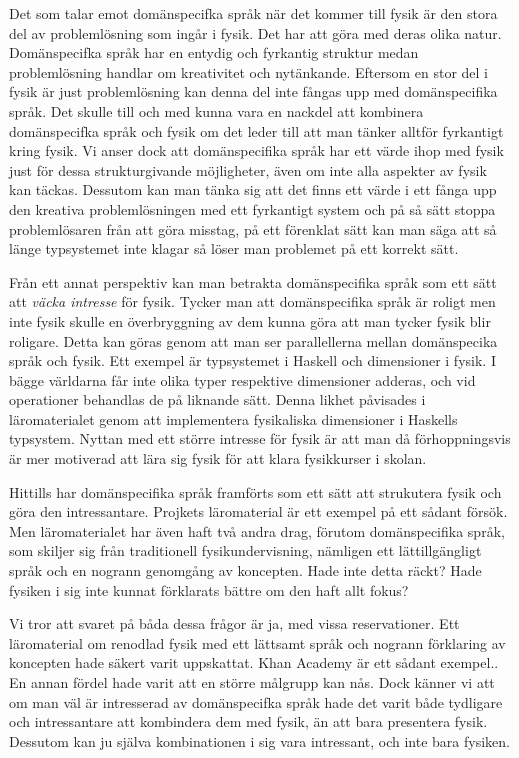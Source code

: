 \begin{binge}
Det som talar emot domänspecifka språk när det kommer till fysik är den stora del av problemlösning som ingår i fysik. Det har att göra med deras olika natur. Domänspecifka språk har en entydig och fyrkantig struktur medan problemlösning handlar om kreativitet och nytänkande. Eftersom en stor del i fysik är just problemlösning kan denna del inte fångas upp med domänspecifika språk. Det skulle till och med kunna vara en nackdel att kombinera domänspecifka språk och fysik om det leder till att man tänker alltför fyrkantigt kring fysik. Vi anser dock att domänspecifika språk har ett värde ihop med fysik just för dessa strukturgivande möjligheter, även om inte alla aspekter av fysik kan täckas. Dessutom kan man tänka sig att det finns ett värde i ett fånga upp den kreativa problemlösningen med ett fyrkantigt system och på så sätt stoppa problemlösaren från att göra misstag, på ett förenklat sätt kan man säga att så länge typsystemet inte klagar så löser man problemet på ett korrekt sätt.

Från ett annat perspektiv kan man betrakta domänspecifika språk som ett sätt att \textit{väcka intresse} för fysik. Tycker man att domänspecifika språk är roligt men inte fysik skulle en överbryggning av dem kunna göra att man tycker fysik blir roligare. Detta kan göras genom att man ser parallellerna mellan domänspecika språk och fysik. Ett exempel är typsystemet i Haskell och dimensioner i fysik. I bägge världarna får inte olika typer respektive dimensioner adderas, och vid operationer behandlas de på liknande sätt. Denna likhet påvisades i läromaterialet genom att implementera fysikaliska dimensioner i Haskells typsystem. Nyttan med ett större intresse för fysik är att man då förhoppningsvis är mer motiverad att lära sig fysik för att klara fysikkurser i skolan.

Hittills har domänspecifika språk framförts som ett sätt att strukutera fysik och göra den intressantare. Projkets läromaterial är ett exempel på ett sådant försök. Men läromaterialet har även haft två andra drag, förutom domänspecifika språk, som skiljer sig från traditionell fysikundervisning, nämligen ett lättillgängligt språk och en nogrann genomgång av koncepten. Hade inte detta räckt? Hade fysiken i sig inte kunnat förklarats bättre om den haft allt fokus?

Vi tror att svaret på båda dessa frågor är ja, med vissa reservationer. Ett läromaterial om renodlad fysik med ett lättsamt språk och nogrann förklaring av koncepten hade säkert varit uppskattat. Khan Academy är ett sådant exempel.\cite{khan}. En annan fördel hade varit att en större målgrupp kan nås. Dock känner vi att om man väl är intresserad av domänspecifka språk hade det varit både tydligare och intressantare att kombindera dem med fysik, än att bara presentera fysik. Dessutom kan ju själva kombinationen i sig vara intressant, och inte bara fysiken.


\end{binge}
